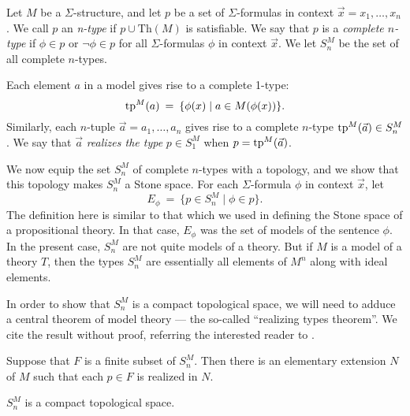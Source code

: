 \begin{defn} Let $M$ be a $\Sigma$-structure, and let $p$ be a set of
  $\Sigma$-formulas in context $\vec{x}=x_1,\dots ,x_n$.  We call $p$
  an \emph{n-type} if $p\cup \mathrm{Th}(M)$ is satisfiable.  We say
  that $p$ is a \emph{complete $n$-type} if $\phi\in p$ or
  $\neg\phi\in p$ for all $\Sigma$-formulas $\phi$ in context
  $\vec{x}$.  We let $S^M_n$ be the set of all complete
  $n$-types. \end{defn}

Each element $a$ in a model gives rise to a complete 1-type:
\[ \mathrm{tp}^{M}(a) \: = \: \{ \phi (x) \mid a\in M(\phi (x)) \} .\]
Similarly, each $n$-tuple $\vec{a}=a_1,\dots ,a_n$ gives rise to a
complete $n$-type $\mathrm{tp}^{M}(\vec{a})\in S_n^M$.  We say that $\vec{a}$
\emph{realizes the type} $p\in S^M_1$ when $p=\mathrm{tp}^{M}(\vec{a})$.

\begin{defn} We now equip the set $S^M_n$ of complete $n$-types with a
  topology, and we show that this topology makes $S^M_n$ a Stone
  space.  For each $\Sigma$-formula $\phi$ in context $\vec{x}$, let
  \[ E_\phi \: = \: \{ p\in S^M_n \mid \phi \in p \} .\] The
  definition here is similar to that which we used in defining the
  Stone space of a propositional theory.  In that case, $E_\phi$ was
  the set of models of the sentence $\phi$.  In the present case,
  $S^M_n$ are not quite models of a theory.  But if $M$ is a model of
  a theory $T$, then the types $S_n^M$ are essentially all elements of
  $M^n$ along with ideal elements.  \end{defn}

In order to show that $S^M_n$ is a compact topological space, we will
need to adduce a central theorem of model theory --- the so-called
``realizing types theorem''.  We cite the result without proof,
referring the interested reader to \cite[Chap 4]{marker}.

\begin{thm} Suppose that $F$ is a finite subset of
  $S_n^M$.  Then there is an elementary extension $N$ of $M$ such that
  each $p\in F$ is realized in $N$. \label{realize} \end{thm}

\begin{prop} $S_n^M$ is a compact topological space. \end{prop}

